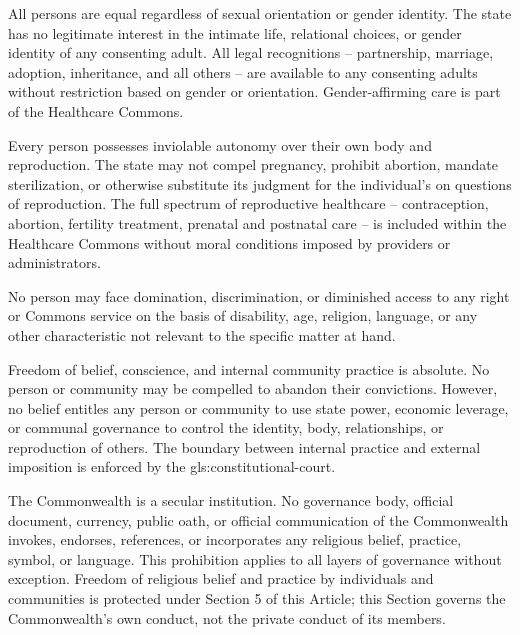 All persons are equal regardless of sexual orientation or gender identity. The state has no legitimate interest in the intimate life, relational choices, or gender identity of any consenting adult. All legal recognitions -- partnership, marriage, adoption, inheritance, and all others -- are available to any consenting adults without restriction based on gender or orientation. Gender-affirming care is part of the Healthcare Commons.

Every person possesses inviolable autonomy over their own body and reproduction. The state may not compel pregnancy, prohibit abortion, mandate sterilization, or otherwise substitute its judgment for the individual's on questions of reproduction. The full spectrum of reproductive healthcare -- contraception, abortion, fertility treatment, prenatal and postnatal care -- is included within the Healthcare Commons without moral conditions imposed by providers or administrators.

No person may face domination, discrimination, or diminished access to any right or Commons service on the basis of disability, age, religion, language, or any other characteristic not relevant to the specific matter at hand.

Freedom of belief, conscience, and internal community practice is absolute. No person or community may be compelled to abandon their convictions. However, no belief entitles any person or community to use state power, economic leverage, or communal governance to control the identity, body, relationships, or reproduction of others. The boundary between internal practice and external imposition is enforced by the \gls{gls:constitutional-court}.

The Commonwealth is a secular institution. No governance body, official document, currency, public oath, or official communication of the Commonwealth invokes, endorses, references, or incorporates any religious belief, practice, symbol, or language. This prohibition applies to all layers of governance without exception. Freedom of religious belief and practice by individuals and communities is protected under Section 5 of this Article; this Section governs the Commonwealth's own conduct, not the private conduct of its members.

